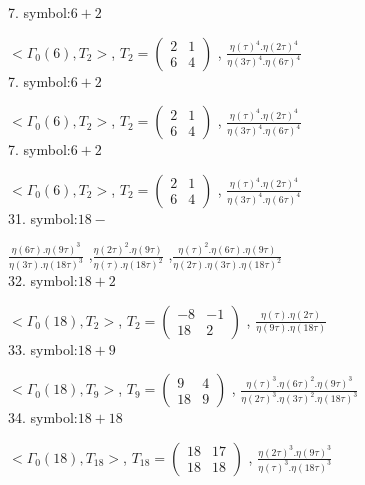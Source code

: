 
7. symbol:$ 6+2 $

$ < \Gamma_0 ( 6 ), T_2 >  $,
$
T_2 = 
\left(
\begin{array}{cc}
2 & 1 \\
6 & 4
\end{array}
\right)
$
, {$ \frac{\eta(\tau)^4 . \eta(2\tau)^4}{\eta(3\tau)^4 . \eta(6\tau)^4} $}
\\

7. symbol:$ 6+2 $

$ < \Gamma_0 ( 6 ), T_2 >  $,
$
T_2 = 
\left(
\begin{array}{cc}
2 & 1 \\
6 & 4
\end{array}
\right)
$
, {$ \frac{\eta(\tau)^4 . \eta(2\tau)^4}{\eta(3\tau)^4 . \eta(6\tau)^4} $}
\\

7. symbol:$ 6+2 $

$ < \Gamma_0 ( 6 ), T_2 >  $,
$
T_2 = 
\left(
\begin{array}{cc}
2 & 1 \\
6 & 4
\end{array}
\right)
$
, {$ \frac{\eta(\tau)^4 . \eta(2\tau)^4}{\eta(3\tau)^4 . \eta(6\tau)^4} $}
\\

31. symbol:$ 18- $

{$ \frac{\eta(6\tau) . \eta(9\tau)^3}{\eta(3\tau) . \eta(18\tau)^3} $}
,{$ \frac{\eta(2\tau)^2 . \eta(9\tau)}{\eta(\tau) . \eta(18\tau)^2} $}
,{$ \frac{\eta(\tau)^2 . \eta(6\tau) .\eta(9\tau)}{\eta(2\tau) . \eta(3\tau). \eta(18\tau)^2} $}
\\

32. symbol:$ 18+2 $

$ < \Gamma_0 ( 18 ), T_2 >  $,
$
T_2 = 
\left(
\begin{array}{cc}
-8 & -1 \\
18 & 2
\end{array}
\right)
$
, {$ \frac{\eta(\tau) . \eta(2\tau)}{\eta(9\tau) . \eta(18\tau)} $}
\\

33. symbol:$ 18+9 $

$ < \Gamma_0 ( 18 ), T_9 >  $,
$
T_9 = 
\left(
\begin{array}{cc}
9 & 4 \\
18 & 9
\end{array}
\right)
$
, {$ \frac{\eta(\tau)^3 . \eta(6\tau)^2 .\eta(9\tau)^3}{\eta(2\tau)^3 . \eta(3\tau)^2 . \eta(18\tau)^3} $}
\\

34. symbol:$ 18+18 $

$ < \Gamma_0 ( 18 ), T_{18} >  $,
$
T_{18} = 
\left(
\begin{array}{cc}
18 & 17 \\
18 & 18
\end{array}
\right)
$
, {$ \frac{\eta(2\tau)^3 . \eta(9\tau)^3}{\eta(\tau)^3 . \eta(18\tau)^3} $}
\\